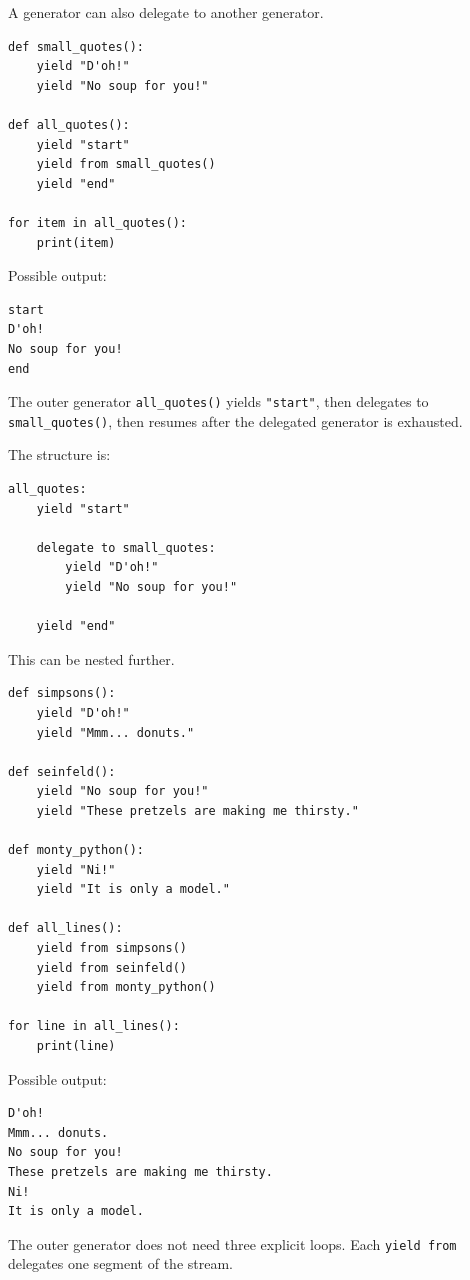A generator can also delegate to another generator.

\begin{verbatim}
def small_quotes():
    yield "D'oh!"
    yield "No soup for you!"

def all_quotes():
    yield "start"
    yield from small_quotes()
    yield "end"

for item in all_quotes():
    print(item)
\end{verbatim}

Possible output:

\begin{verbatim}
start
D'oh!
No soup for you!
end
\end{verbatim}

The outer generator \texttt{all\_quotes()} yields \texttt{"start"}, then delegates to \texttt{small\_quotes()}, then resumes after the delegated generator is exhausted.

The structure is:

\begin{verbatim}
all_quotes:
    yield "start"

    delegate to small_quotes:
        yield "D'oh!"
        yield "No soup for you!"

    yield "end"
\end{verbatim}

This can be nested further.

\begin{verbatim}
def simpsons():
    yield "D'oh!"
    yield "Mmm... donuts."

def seinfeld():
    yield "No soup for you!"
    yield "These pretzels are making me thirsty."

def monty_python():
    yield "Ni!"
    yield "It is only a model."

def all_lines():
    yield from simpsons()
    yield from seinfeld()
    yield from monty_python()

for line in all_lines():
    print(line)
\end{verbatim}

Possible output:

\begin{verbatim}
D'oh!
Mmm... donuts.
No soup for you!
These pretzels are making me thirsty.
Ni!
It is only a model.
\end{verbatim}

The outer generator does not need three explicit loops. Each \texttt{yield from} delegates one segment of the stream.

